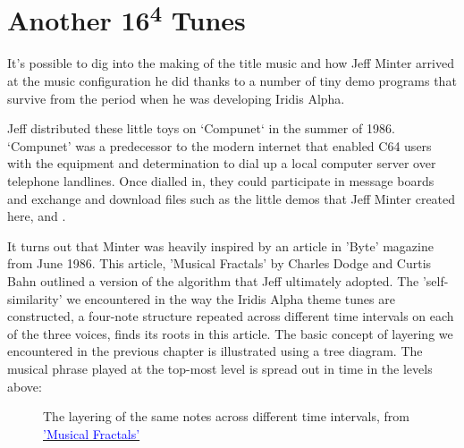 \chapter{Another 16\textsuperscript{4} Tunes} 
\label{sec:torusmusic}

It's possible to dig into the making of the title music and how Jeff Minter
arrived at the music configuration he did thanks to a number of tiny demo programs that
survive from the period when he was developing Iridis Alpha.

Jeff distributed these little toys on `Compunet` in the summer of 1986. `Compunet' was a
predecessor to the modern internet that enabled C64 users with the equipment and
determination to dial up a local computer server over telephone landlines. Once dialled in,
they could participate in message boards and exchange and download files such as the little
 demos that Jeff Minter created here, 
\href{https://github.com/mwenge/iridisalpha/tree/master/demos/torus}{\textcolor{blue}{}}
and
\href{https://github.com/mwenge/iridisalpha/tree/master/demos/torus2}{\textcolor{blue}{}}.

It turns out that Minter was heavily inspired by an article in 'Byte' magazine from June 1986.
This article, 'Musical Fractals' by Charles Dodge and Curtis Bahn  outlined a version of the
algorithm that Jeff ultimately adopted. The 'self-similarity' we encountered
in the way the Iridis Alpha theme tunes are constructed, a four-note structure
repeated across different time intervals on each of the three voices, finds its
roots in this article. The basic concept of layering we encountered in the previous chapter is illustrated using a tree diagram. The musical phrase played
at the top-most level is spread out in time in the levels above:

\begin{figure}[H]
  {
    \begin{adjustbox}{width=9cm,center}
    \end{adjustbox}
  }\caption[]{The layering of the same notes across different time intervals, from \href{https://archive.org/details/byte-magazine-1986-06/page/n191/mode/2up}{\textcolor{blue}{'Musical Fractals'}}}
\end{figure}

